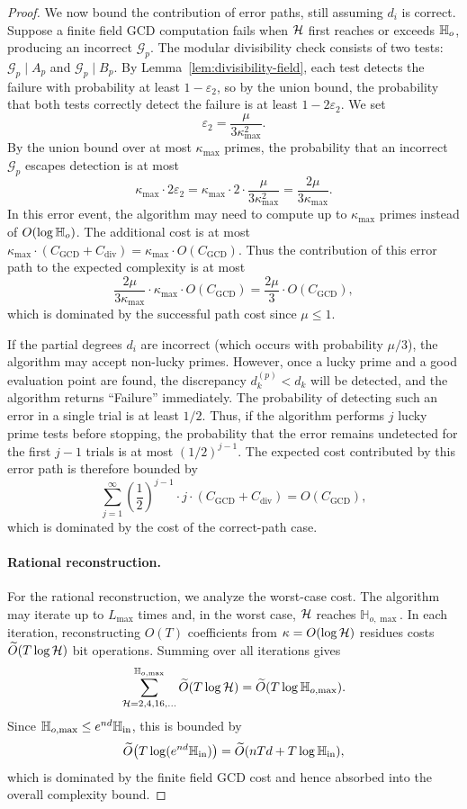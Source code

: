 \documentclass{article}
\numberwithin{equation}{section}
\begin{document}
\begin{proof}
We now bound the contribution of error paths, still assuming $d_i$ is correct. Suppose a finite field GCD computation fails when ${\mathcal{H}}$ first reaches or exceeds $\mathbb{H}_{o}$, producing an incorrect $\mathcal{G}_p$. The modular divisibility check consists of two tests: $\mathcal{G}_p \mid A_p$ and $\mathcal{G}_p \mid B_p$. By Lemma~\ref{lem:divisibility-field}, each test detects the failure with probability at least $1 - \varepsilon_2$, so by the union bound, the probability that both tests correctly detect the failure is at least $1 - 2\varepsilon_2$. We set
\[
\varepsilon_2 = \frac{\mu}{3\kappa^2_{\max}}.
\]
By the union bound over at most $\kappa_{\max}$ primes, the probability that an incorrect $\mathcal{G}_p$ escapes detection is at most
\[
\kappa_{\max} \cdot 2\varepsilon_2
= \kappa_{\max} \cdot 2 \cdot \frac{\mu}{3\kappa^2_{\max}}
= \frac{2\mu}{3\kappa_{\max}}.
\]
In this error event, the algorithm may need to compute up to $\kappa_{\max}$ primes instead of $O(\log \mathbb{H}_{o})$. The additional cost is at most $\kappa_{\max} \cdot (C_{\text{GCD}} + C_{\text{div}}) = \kappa_{\max} \cdot O(C_{\text{GCD}})$. Thus the contribution of this error path to the expected complexity is at most
\[
\frac{2\mu}{3\kappa_{\max}} \cdot \kappa_{\max}\cdot O( C_{\text{GCD}})=\frac{2\mu}{3} \cdot  O( C_{\text{GCD}}),
\]
which is dominated by the successful path cost since $\mu\le 1$.

If the partial degrees $d_i$ are incorrect (which occurs with probability $\mu/3$), the algorithm may accept non-lucky primes. However, once a lucky prime and a good evaluation point are found, the discrepancy $d_k^{(p)} < d_k$ will be detected, and the algorithm returns ``Failure'' immediately. The probability of detecting such an error in a single trial is at least $1/2$. Thus, if the algorithm performs $j$ lucky prime tests before stopping, the probability that the error remains undetected for the first $j-1$ trials is at most $(1/2)^{j-1}$. The expected cost contributed by this error path is therefore bounded by
\[
\sum_{j=1}^{\infty} \left(\frac{1}{2}\right)^{j-1} \cdot j \cdot (C_{\text{GCD}} + C_{\text{div}})
= O(C_{\text{GCD}}),
\]
which is dominated by the cost of the correct-path case.




\paragraph{Rational reconstruction.}

For the rational reconstruction, we analyze the worst-case cost. The algorithm may iterate up to $L_{\max}$ times and, in the worst case, ${\mathcal{H}}$ reaches $\mathbb{H}_{o,\max}$. In each iteration, reconstructing $O(T)$ coefficients from $\kappa = O(\log {\mathcal{H}})$ residues costs $\widetilde{O}(T \log {\mathcal{H}})$ bit operations. Summing over all iterations gives
\[
\sum_{{\mathcal{H}} = 2,4,16,\dots}^{\mathbb{H}_{o,\max}} \widetilde{O}(T \log {\mathcal{H}})
= \widetilde{O}(T \log \mathbb{H}_{o,\max}).
\]
Since $\mathbb{H}_{o,\max} \le e^{nd}\mathbb{H}_{\rm in}$, this is bounded by
\[
\widetilde{O}\bigl(T \log(e^{nd}\mathbb{H}_{\rm in})\bigr)
= \widetilde{O}(nTd + T\log \mathbb{H}_{\rm in}),
\]
which is dominated by the finite field GCD cost and hence absorbed into the overall complexity bound.




\end{proof}
\end{document}
